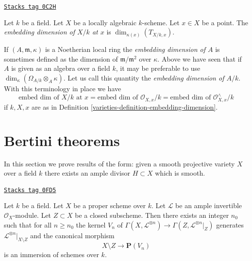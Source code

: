 \begin{definition}
\label{varieties-definition-embedding-dimension}
\href{https://stacks.math.columbia.edu/tag/0C2H}{\texttt{Stacks tag 0C2H}}

Let $k$ be a field. Let $X$ be a locally algebraic $k$-scheme.
Let $x \in X$ be a point. The {\it embedding dimension of $X/k$ at $x$}
is $\dim_{\kappa(x)}(T_{X/k, x})$.
\end{definition}

If $(A, \mathfrak m, \kappa)$ is a Noetherian local ring
the {\it embedding dimension of $A$} is sometimes defined as the dimension of
$\mathfrak m/\mathfrak m^2$ over $\kappa$. Above we have seen that
if $A$ is given as an algebra over a field $k$, it may be preferable
to use $\dim_\kappa(\Omega_{A/k} \otimes_A \kappa)$. Let
us call this quantity the {\it embedding dimension of $A/k$}.
With this terminology in place we have
$$
\text{embed dim of }X/k\text{ at }x =
\text{embed dim of }\mathcal{O}_{X, x}/k =
\text{embed dim of }\mathcal{O}_{X, x}^\wedge/k
$$
if $k, X, x$ are as in Definition \ref{varieties-definition-embedding-dimension}.

\section{Bertini theorems}
\label{varieties-section-bertini}
In this section we prove results of the form: given a smooth projective
variety $X$ over a field $k$ there exists an ample divisor $H \subset X$
which is smooth.

\begin{lemma}
\label{varieties-lemma-generate-over-complement}
\href{https://stacks.math.columbia.edu/tag/0FD5}{\texttt{Stacks tag 0FD5}}

Let $k$ be a field. Let $X$ be a proper scheme over $k$. Let $\mathcal{L}$
be an ample invertible $\mathcal{O}_X$-module. Let $Z \subset X$ be a
closed subscheme. Then there exists an integer $n_0$ such that for all
$n \geq n_0$ the kernel $V_n$ of
$\Gamma(X, \mathcal{L}^{\otimes n}) \to \Gamma(Z, \mathcal{L}^{\otimes n}|_Z)$
generates $\mathcal{L}^{\otimes n}|_{X \setminus Z}$ and
the canonical morphism
$$
X \setminus Z \longrightarrow \mathbf{P}(V_n)
$$
is an immersion of schemes over $k$.
\end{lemma}

